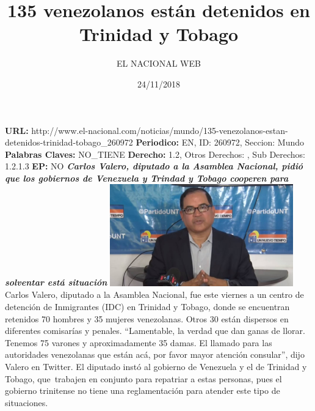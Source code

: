 \documentclass{article}%
\title{\textbf{135 venezolanos están detenidos en Trinidad y Tobago}}%
\author{EL NACIONAL WEB}%
\date{24/11/2018}%
\begin{document}
%
\normalsize%
\maketitle%
\textbf{URL: }%
http://www.el{-}nacional.com/noticias/mundo/135{-}venezolanos{-}estan{-}detenidos{-}trinidad{-}tobago\_260972\newline%
%
\textbf{Periodico: }%
EN, %
ID: %
260972, %
Seccion: %
Mundo\newline%
%
\textbf{Palabras Claves: }%
NO\_TIENE\newline%
%
\textbf{Derecho: }%
1.2, %
Otros Derechos: %
, %
Sub Derechos: %
1.2.1.3\newline%
%
\textbf{EP: }%
NO\newline%
\newline%
%
\textbf{\textit{Carlos Valero, diputado a la Asamblea Nacional, pidió que los gobiernos de Venezuela y Trindad y Tobago cooperen para solventar está situación}}%
\newline%
\newline%
%
\includegraphics[width=300px]{57.jpg}%
\newline%
%
Carlos Valero, diputado a la Asamblea Nacional, fue este viernes a un centro de detención de Inmigrantes (IDC) en Trinidad y Tobago, donde se encuentran retenidos 70 hombres y 35 mujeres venezolanas. Otros 30 están dispersos en diferentes comisarías y penales.%
\newline%
%
“Lamentable, la verdad que dan ganas de llorar. Tenemos 75 varones y aproximadamente 35 damas. El llamado para las autoridades venezolanas que están acá, por favor mayor atención consular”, dijo Valero en Twitter.%
\newline%
%
El diputado instó al gobierno de Venezuela y el de Trinidad y Tobago, que~trabajen en conjunto para repatriar a estas personas, pues el gobierno trinitense no tiene una reglamentación para atender este tipo de situaciones.%
\newline%
%
\end{document}
